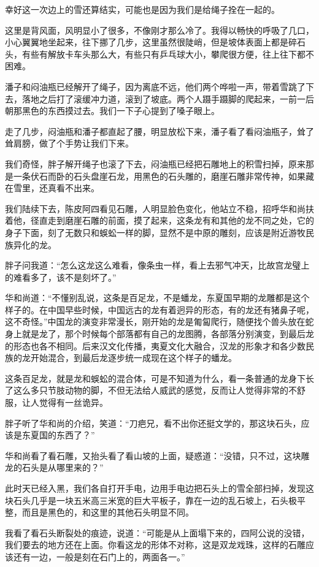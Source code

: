 幸好这一次边上的雪还算结实，可能也是因为我们是给绳子拴在一起的。

这里是背风面，风明显小了很多，不像刚才那么冷了。我得以畅快的呼吸了几口，小心翼翼地坐起来，往下挪了几步，这里虽然很陡峭，但是坡体表面上都是碎石头，有些有解放卡车头那么大，有些只有乒乓球大小，攀爬很方便，往上往下都不困难。

潘子和闷油瓶已经解开了绳子，因为离底不远，他们两个哗啦一声，带着雪跳了下去，落地之后打了滚缓冲力道，滚到了坡底。两个人蹑手蹑脚的爬起来，一前一后朝那黑色的东西摸过去。我们一下子心提到了嗓子眼上。

走了几步，闷油瓶和潘子都直起了腰，明显放松下来，潘子看了看闷油瓶子，耸了耸肩膀，做了个手势让我们下来。

我们奇怪，胖子解开绳子也滚了下去，闷油瓶已经把石雕地上的积雪扫掉，原来那是一条伏石而卧的石头盘崖石龙，用黑色的石头雕的，磨崖石雕非常传神，如果藏在雪里，还真看不出来。

我们陆续下去，陈皮阿四看见石雕，人明显脸色变化，他站立不稳，招呼华和尚扶着他，径直走到磨崖石雕的前面，摸了起来，这条龙有和其他的龙不同之处，它的身子下面，刻了无数只和蜈蚣一样的脚，显然不是中原的雕刻，应该是附近游牧民族异化的龙。

胖子问我道：“怎么这龙这么难看，像条虫一样，看上去邪气冲天，比故宫龙璧上的难看多了，该不是刻坏了。”

华和尚道：“不懂别乱说，这条是百足龙，不是蟠龙，东夏国早期的龙雕都是这个样子的。在中国早些时候，中国远古的龙有着迥异的形态，有的龙还有猪鼻子呢，这不奇怪。”中国龙的演变非常漫长，刚开始的龙是匍匐爬行，随便找个兽头放在蛇身上就是龙了，那个时候每个部落都有自己的龙图腾，各部落分别演变，到最后龙的形态也各不相同。后来汉文化传播，夷夏文化大融合，汉龙的形象才和各少数民族的龙开始混合，到最后龙逐步统一成现在这个样子的蟠龙。

这条百足龙，就是龙和蜈蚣的混合体，可是不知道为什么，看一条普通的龙身下长了这么多只节肢动物的脚，不但无法给人威武的感觉，反而让人觉得非常的不舒服，让人觉得有一丝诡异。

胖子听了华和尚的介绍，笑道：“刀疤兄，看不出你还挺文学的，那这块石头，应该是东夏国的东西了？”

华和尚看了看石雕，又抬头看了看山坡的上面，疑惑道：“没错，只不过，这块雕龙的石头是从哪里来的？”

此时天已经入黑，我们各自打开手电，边用手电边把石头上的雪全部扫掉，发现这块石头几乎是一块五米高三米宽的巨大平板子，靠在一边的乱石坡上，石头极平整，而且是黑色的，和这里的其他石头明显不同。

我看了看石头断裂处的痕迹，说道：“可能是从上面塌下来的，四阿公说的没错，我们要去的地方还在上面。你看这龙的形体不对称，这是双龙戏珠，这样的石雕应该还有一边，一般是刻在石门上的，两面各一。”

